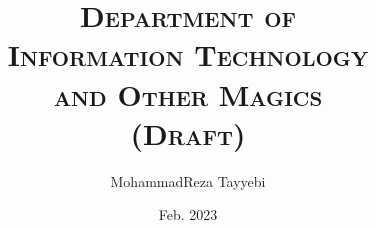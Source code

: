 \documentclass[a4paper,12pt]{book}
\begin{document}
\author{MohammadReza Tayyebi}
\title{\textsc{Department of\\Information Technology\\and Other Magics\\(Draft)}}
\date{Feb. 2023}

\frontmatter
\maketitle
\tableofcontents

\mainmatter




\backmatter
\end{document}
